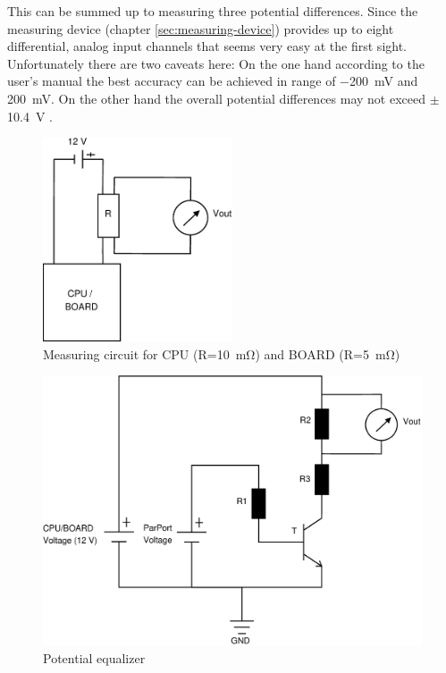 This can be summed up to measuring three potential differences. Since the
measuring device (chapter \ref{sec:measuring-device}) provides up to eight
differential, analog input channels that seems very easy at the first sight.
Unfortunately there are two caveats here: On the one hand according to the
user's manual \cite{NIManual2009} the best accuracy can be achieved in range of
\SI{-200}{\milli\volt} and \SI{200}{\milli\volt}. On the other hand the overall
potential differences may not exceed $\pm$\SI{10.4}{\volt}
\cite{NISpec2009}.

\begin{figure}
  \centering
    \includegraphics[width=0.5\textwidth]{fig/measuring-circuit.eps}
  \caption{Measuring circuit for CPU (R=\SI{10}{\milli\ohm}) and BOARD
(R=\SI{5}{\milli\ohm})}
  \label{fig:circuit}
\end{figure}

\begin{figure}
  \centering
    \includegraphics[width=\textwidth]{fig/potential-equalizer.eps}
  \caption{Potential equalizer}
  \label{fig:potential-equalizer}
\end{figure}

